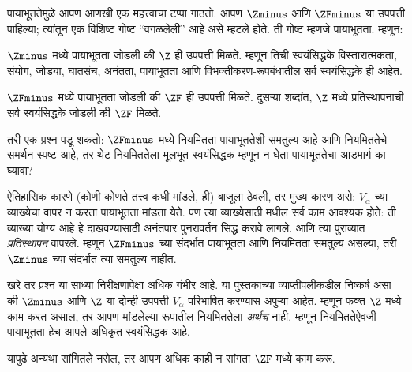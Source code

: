 \documentclass[../../../include/open-logic-section]{subfiles}
\begin{document}

पायाभूततेमुळे आपण आणखी एक महत्त्वाचा टप्पा गाठतो. आपण $\Zminus$ आणि $\ZFminus$ या उपपत्ती पाहिल्या; त्यांतून एक विशिष्ट गोष्ट ``वगळलेली'' आहे असे म्हटले होते. ती गोष्ट म्हणजे पायाभूतता. म्हणून:

\begin{defn}
$\Zminus$ मध्ये पायाभूतता जोडली की $\Z$ ही उपपत्ती मिळते. म्हणून तिची स्वयंसिद्धके विस्तारात्मकता, संयोग, जोड्या, घातसंच, अनंतता, पायाभूतता आणि विभक्तीकरण-रूपबंधातील सर्व स्वयंसिद्धके ही आहेत.

$\ZFminus$ मध्ये पायाभूतता जोडली की $\ZF$ ही उपपत्ती मिळते. दुसऱ्या शब्दांत, $\Z$ मध्ये प्रतिस्थापनाची सर्व स्वयंसिद्धके जोडली की $\ZF$ मिळते.
\end{defn}

तरी एक प्रश्न पडू शकतो: $\ZFminus$ मध्ये नियमितता पायाभूततेशी समतुल्य आहे आणि नियमिततेचे समर्थन स्पष्ट आहे, तर थेट नियमिततेला मूलभूत स्वयंसिद्धक म्हणून न घेता पायाभूततेचा आडमार्ग का घ्यावा?

ऐतिहासिक कारणे (कोणी कोणते तत्त्व कधी मांडले, ही) बाजूला ठेवली, तर मुख्य कारण असे: $V_\alpha$ च्या व्याख्येचा वापर न करता पायाभूतता मांडता येते. पण त्या व्याख्येसाठी  मधील सर्व काम आवश्यक होते: ती व्याख्या योग्य आहे हे दाखवण्यासाठी अनंतपार पुनरावर्तन सिद्ध करावे लागले. आणि त्या पुराव्यात \emph{प्रतिस्थापन} वापरले. म्हणून $\ZFminus$ च्या संदर्भात पायाभूतता आणि नियमितता समतुल्य असल्या, तरी $\Zminus$ च्या संदर्भात त्या समतुल्य नाहीत.

खरे तर प्रश्न या साध्या निरीक्षणापेक्षा अधिक गंभीर आहे. या पुस्तकाच्या व्याप्तीपलीकडील निष्कर्ष असा की $\Zminus$ आणि $\Z$ या दोन्ही उपपत्ती $V_\alpha$ परिभाषित करण्यास अपुऱ्या आहेत. म्हणून फक्त $\Z$ मध्ये काम करत असाल, तर आपण मांडलेल्या रूपातील नियमिततेला \emph{अर्थच} नाही. म्हणून नियमिततेऐवजी पायाभूतता हेच आपले अधिकृत स्वयंसिद्धक आहे.

यापुढे अन्यथा सांगितले नसेल, तर आपण अधिक काही न सांगता $\ZF$ मध्ये काम करू.
\end{document}
